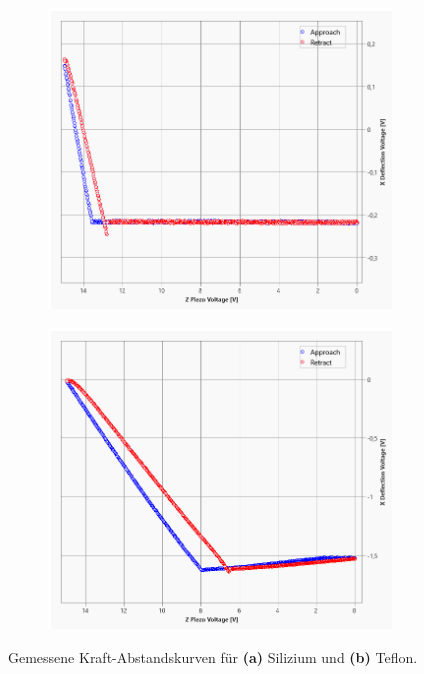 \begin{figure}[H]
    \centering
    \begin{subfigure}{0.49\textwidth}
        \includegraphics[width=\textwidth]{bilder/Kraft_Abstand/FDC_Si.png}
        \caption{}
    \end{subfigure}
    \begin{subfigure}{0.49\textwidth}
        \includegraphics[width=\textwidth]{bilder/Kraft_Abstand/FDC_Teflon.png}
        \caption{}
    \end{subfigure}
    \caption{Gemessene Kraft-Abstandskurven für \textbf{(a)} Silizium und \textbf{(b)} Teflon.}
    \label{fig:Kraft}
\end{figure}

